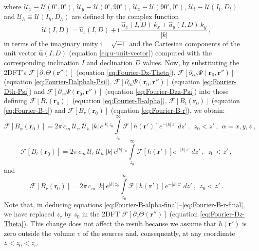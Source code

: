 where 
$\mathcal{U}_{x} \equiv \mathcal{U}(0^{\circ}, 0^{\circ})$,
$\mathcal{U}_{y} \equiv \mathcal{U}(0^{\circ}, 90^{\circ})$,
$\mathcal{U}_{z} \equiv \mathcal{U}(90^{\circ}, 0^{\circ})$,
$\mathcal{U}_{t} \equiv \mathcal{U}(I_{t}, D_{t})$ and
$\mathcal{U}_{h} \equiv \mathcal{U}(I_{h}, D_{h})$ are defined by the complex function
\begin{equation}
\mathcal{U}(I, D) = \hat{u}_{z}(I, D) + 
\mathrm{i} \: \frac{ \hat{u}_{x}(I, D) \: k_{x} + 
\hat{u}_{y}(I, D) \: k_{y} }{|k|} \: ,
\label{eq:U-complex-function}
\end{equation}
in terms of the imaginary unity $\mathrm{i} = \sqrt{-1}$
and the Cartesian components of the unit vector
$\hat{\mathbf{u}}(I, D)$ (equation \ref{eq:u-unit-vector}) computed with 
the corresponding inclination $I$ and declination $D$ values.
Now, by substituting the 2DFT's 
$\mathcal{F}\left[ \partial_{z} \Theta(\mathbf{r}'') \right]$ 
(equation \ref{eq:Fourier-Dz-Theta}),
$\mathcal{F}\left[ \partial_{\alpha h} \Psi(\mathbf{r}_{0}, \mathbf{r}'') \right]$
(equation \ref{eq:Fourier-Dalphah-Psi}), 
$\mathcal{F}\left[ \partial_{th} \Psi(\mathbf{r}_{0}, \mathbf{r}'') \right]$
(equation \ref{eq:Fourier-Dth-Psi}) and
$\mathcal{F}\left[ \partial_{zz} \Psi(\mathbf{r}_{0}, \mathbf{r}'') \right]$ 
(equation \ref{eq:Fourier-Dzz-Psi}) into those defining
$\mathcal{F}\left[ B_{t}(\mathbf{r}_{0}) \right]$
(equation \ref{eq:Fourier-B-alpha}),
$\mathcal{F}\left[ B_{t}(\mathbf{r}_{0}) \right]$
(equation \ref{eq:Fourier-B-t}) and 
$\mathcal{F}\left[ B_{r}(\mathbf{r}_{0}) \right]$
(equation \ref{eq:Fourier-B-r}), we obtain:
\begin{equation}
\mathcal{F}\left[ B_{\alpha}(\mathbf{r}_{0}) \right] = 
2\pi \, c_{m} \, 
\mathcal{U}_{\alpha} \: \mathcal{U}_{h} \: |k| \, e^{|k| \, z_{0}} 
\int\limits_{z_{0}}^{\infty} 
\mathcal{F}\left[ h(\mathbf{r}') \right] e^{-|k| \, z'} \:
dz' \: , \:\: z_{0} < z' \: , \:\: \alpha = x, y, z \: ,
\label{eq:Fourier-B-alpha-final}
\end{equation}
\begin{equation}
\mathcal{F}\left[ B_{t}(\mathbf{r}_{0}) \right] = 
2\pi \, c_{m} \, 
\mathcal{U}_{t} \: \mathcal{U}_{h} \: |k| \, e^{|k| \, z_{0}} 
\int\limits_{z_{0}}^{\infty} 
\mathcal{F}\left[ h(\mathbf{r}') \right] e^{-|k| \, z'} \:
dz' \: , \:\: z_{0} < z' \: ,
\label{eq:Fourier-B-t-final}
\end{equation}
and
\begin{equation}
	\mathcal{F}\left[ B_{r}(\mathbf{r}_{0}) \right] = 
	2\pi \, c_{m}
	\: |k| \, e^{|k| \, z_{0}} 
	\int\limits_{z_{0}}^{\infty} 
	\mathcal{F}\left[ h(\mathbf{r}') \right] e^{-|k| \, z'} \:
	dz' \: , \:\: z_{0} < z' \: .
	\label{eq:Fourier-B-r-final}
\end{equation}
Note that, in deducing equations 
\ref{eq:Fourier-B-alpha-final}--\ref{eq:Fourier-B-r-final}, 
we have replaced $z_{c}$ by
$z_{0}$ in the 2DFT $\mathcal{F}\left[ \partial_{z} \Theta(\mathbf{r}'') \right]$ 
(equation \ref{eq:Fourier-Dz-Theta}). This change does not affect the result
because we assume that $h(\mathbf{r}')$ is zero outside the volume $v$ of the sources
and, consequently, at any coordinate $z < z_{0} < z_{c}$.

